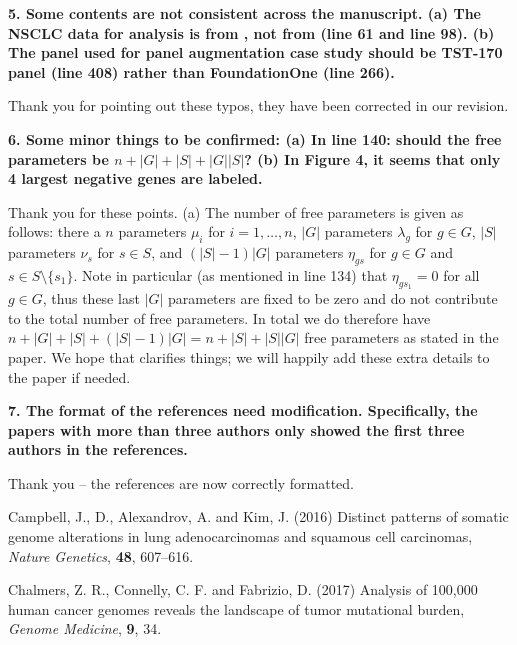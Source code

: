 \documentclass[12pt]{article}
\begin{document}
\textbf{5. Some contents are not consistent across the manuscript.
(a) The NSCLC data for analysis is from \citet{campbell_distinct_2016}, not from \citet{chalmers_analysis_2017} (line 61 and line 98).
(b) The panel used for panel augmentation case study should be TST-170 panel (line 408) rather than FoundationOne (line 266).}

Thank you for pointing out these typos, they have been corrected in our revision. 

\textbf{6. Some minor things to be confirmed:
(a) In line 140: should the free parameters be $n + |G| + |S| + |G||S|$?
(b) In Figure 4, it seems that only 4 largest negative genes are labeled.}

Thank you for these points. (a) The number of free parameters is given as follows: there a $n$ parameters $\mu_i$ for $i = 1, \ldots, n$, $|G|$ parameters $\lambda_g$ for $g \in G$, $|S|$ parameters $\nu_s$ for $s \in S$, and $(|S| - 1) |G|$ parameters $\eta_{gs}$ for $g \in G$ and $s \in S \setminus \{s_1\}$. Note in particular (as mentioned in line 134) that $\eta_{gs_1} = 0$ for all $g \in G$, thus these last $|G|$ parameters are fixed to be zero and do not contribute to the total number of free parameters. In total we do therefore have $n + |G| + |S| + (|S|-1)|G| = n + |S| + |S||G|$ free parameters as stated in the paper.  We hope that clarifies things; we will happily add these extra details to the paper if needed.   

\textbf{7. The format of the references need modification. Specifically, the papers with more than three authors only showed the first three authors in the references.}

Thank you -- the references are now correctly formatted.   


\begin{thebibliography}{75}
 Campbell, J., D., Alexandrov, A. and Kim, J. (2016) Distinct patterns of somatic genome alterations in lung adenocarcinomas and squamous cell carcinomas, \emph{Nature Genetics}, \textbf{48}, 607--616.

 Chalmers, Z. R., Connelly, C. F. and Fabrizio, D. (2017) Analysis of 100,000 human cancer genomes reveals the landscape of tumor mutational burden, \emph{Genome Medicine}, \textbf{9}, 34.
\end{thebibliography}
\end{document}
